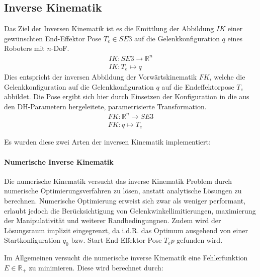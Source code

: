 \subsection[Inverse Kinematik]{Inverse Kinematik }
Das Ziel der Inversen Kinematik ist es die Emittlung der Abbildung $IK$ einer gewünschten End-Effektor Pose $T_e \in SE3$ auf die Gelenkkonfiguration $q$ eines Roboters mit $n$-DoF. 
\begin{gather}
    IK : SE3 \to \mathbb{R}^n \nonumber \\
    IK : T_e \mapsto q
\end{gather}
Dies entspricht der inversen Abbildung der Vorwärtskinematik $FK$, welche die Gelenkkonfiguration auf die Gelenkkonfiguration $q$ auf die Endeffektorpose $T_e$ abbildet. Die Pose ergibt sich hier durch Einsetzen der Konfiguration in die aus den DH-Parametern hergeleitete, parametrisierte Transformation.
\begin{gather}
    FK : \mathbb{R}^n \to SE3 \nonumber \\
    FK : q \mapsto T_e 
\end{gather}


Es wurden diese zwei Arten der inversen Kinematik implementiert:

\paragraph{Numerische Inverse Kinematik}
Die numerische Kinematik versucht das inverse Kinematik Problem durch numerische Optimierungsverfahren zu lösen, anstatt analytische Lösungen zu berechnen. Numerische Optimierung erweist sich zwar als weniger performant, erlaubt jedoch die Berücksichtigung von Gelenkwinkellimitierungen, maximierung der Manipulativität und weiterer Randbedingungnen. Zudem wird der Lösungsraum implizit eingegrenzt, da i.d.R. das Optimum ausgehend von einer Startkonfiguration $q_0$ bzw. Start-End-Effektor Pose $T_ep$ gefunden wird.

Im Allgemeinen versucht die numerische inverse Kinematik eine Fehlerfunktion $E \in \mathbb{R}_+$ zu minimieren. Diese wird berechnet durch:

